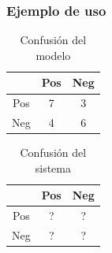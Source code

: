 \begin{frame}
\frametitle{Ejemplo de uso}
\begin{minipage}{0.40\textwidth}
\begin{table}[]
    \begin{tabular}{c|c|c|}
        & Pos & Neg \\ \hline
        Pos & 7 & 3 \\ \hline
        Neg & 4 & 6 \\ \hline
    \end{tabular}
    \caption{Confusi\'on del modelo}
\end{table}
\end{minipage}
\begin{minipage}{0.16\textwidth}
\end{minipage}
\begin{minipage}{0.40\textwidth}
\begin{table}[]
    \begin{tabular}{c|c|c|}
        & Pos & Neg \\ \hline
        Pos & ? & ? \\ \hline
        Neg & ? & ? \\ \hline
    \end{tabular}
    \caption{Confusi\'on del sistema}
\end{table}
\end{minipage}
\end{frame}



